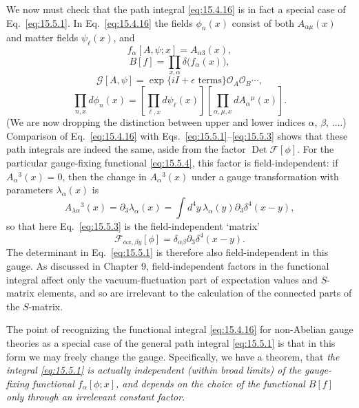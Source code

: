 We now must check that the path integral \eqref{eq:15.4.16} is in fact a
special case of Eq.~\eqref{eq:15.5.1}. In Eq.~\eqref{eq:15.4.16} the fields
$\phi_n(x)$ consist of both $A_{\alpha\mu}(x)$ and matter fields $\psi_\ell(x)$,
and
\begin{equation}
  f_\alpha[A,\psi;x]=A_{\alpha3}(x),
  \tag{15.5.4}\label{eq:15.5.4}
\end{equation}
\begin{equation}
  B[f]=\prod_{x,\alpha}\delta\bigl(f_\alpha(x)\bigr),
  \tag{15.5.5}\label{eq:15.5.5}
\end{equation}
\begin{equation}
  \mathcal G[A,\psi]=\exp\{iI+\epsilon\text{ terms}\}
  \mathcal O_A\mathcal O_B\cdots,
  \tag{15.5.6}\label{eq:15.5.6}
\end{equation}
\begin{equation}
  \prod_{n,x}d\phi_n(x)
  =\left[\prod_{\ell,x}d\psi_\ell(x)\right]
  \left[\prod_{\alpha,\mu,x}dA_\alpha{}^\mu(x)\right].
  \tag{15.5.7}\label{eq:15.5.7}
\end{equation}
(We are now dropping the distinction between upper and lower indices
$\alpha$, $\beta$, $\ldots$.) Comparison of Eq.~\eqref{eq:15.4.16} with
Eqs.~\eqref{eq:15.5.1}--\eqref{eq:15.5.3} shows that these path integrals are
indeed the same, aside from the factor $\operatorname{Det}\mathcal F[\phi]$.
For the particular gauge-fixing functional \eqref{eq:15.5.4}, this factor is
field-independent: if $A_\alpha{}^3(x)=0$, then the change in
$A_\alpha{}^3(x)$ under a gauge transformation with parameters
$\lambda_\alpha(x)$ is
\begin{equation*}
  A_{\lambda\alpha}{}^3(x)=\partial_3\lambda_\alpha(x)
  =\int d^4y\,\lambda_\alpha(y)\partial_3\delta^4(x-y),
\end{equation*}
so that here Eq.~\eqref{eq:15.5.3} is the field-independent `matrix'
\begin{equation*}
  \mathcal F_{\alpha x,\beta y}[\phi]
  =\delta_{\alpha\beta}\partial_3\delta^4(x-y).
\end{equation*}
The determinant in Eq.~\eqref{eq:15.5.1} is therefore also field-independent
in this gauge. As discussed in Chapter 9, field-independent factors in the
functional integral affect only the vacuum-fluctuation part of expectation
values and $S$-matrix elements, and so are irrelevant to the calculation of
the connected parts of the $S$-matrix.

The point of recognizing the functional integral \eqref{eq:15.4.16} for
non-Abelian gauge theories as a special case of the general path integral
\eqref{eq:15.5.1} is that in this form we may freely change the gauge.
Specifically, we have a theorem, that \emph{the integral \eqref{eq:15.5.1} is
actually independent (within broad limits) of the gauge-fixing functional
$f_\alpha[\phi;x]$, and depends on the choice of the functional $B[f]$ only
through an irrelevant constant factor.}

